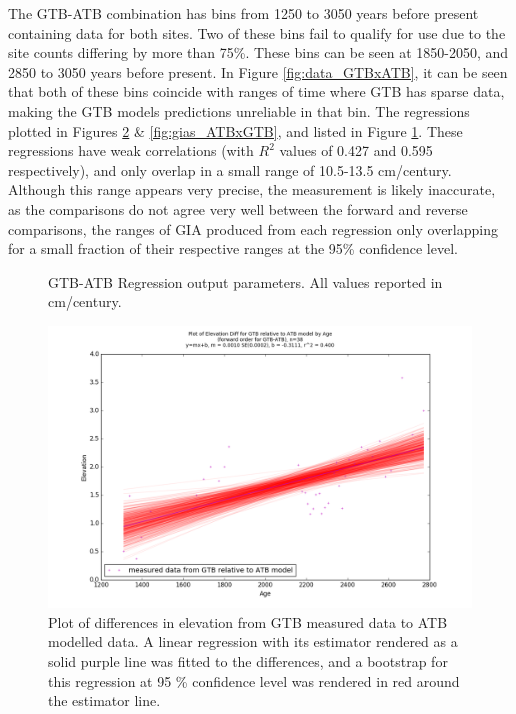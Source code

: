 The GTB-ATB combination has
bins from 1250 to 3050 years before present containing data for both sites. Two of these bins
fail to qualify for use due to the site counts differing by more
than 75\%. These bins can be seen at 1850-2050, and 2850 to 3050 years before present. 
In Figure \ref{fig:data_GTBxATB}, it can be seen that both of these bins coincide with ranges of
time where GTB has sparse data, making the GTB models predictions unreliable in that bin.
The regressions plotted in Figures \ref{fig:gias_GTBxATB} \& \ref{fig:gias_ATBxGTB}, and
listed in Figure \ref{fig:GTBxATB_regression}. These regressions have weak correlations
(with $R^2$ values of 0.427 and 0.595 respectively), and only overlap in a small
range of 10.5-13.5 cm/century. Although this range appears very precise, the measurement
is likely inaccurate, as the comparisons do not agree very well between the forward
and reverse comparisons, the ranges of GIA produced from each regression only
overlapping for a small fraction of their respective ranges at the 95\% confidence
level.\\

\begin{figure}[H]
	\begin{flushleft}
	\end{flushleft}
	\caption{GTB-ATB Regression output parameters. All values reported in cm/century.}
	\label{fig:GTBxATB_regression}
\end{figure}

\newpage

\begin{figure}[H]
	\includegraphics[width=1.3\linewidth, angle=270 ]{data/bothNonZero/withinSeventyFivePercent/gias/theGIA_GTB_relative_to_ATB.png}
	\caption{Plot of differences in elevation from GTB measured data to ATB modelled data. A linear regression with its estimator rendered as
	 a solid purple line was fitted to the differences, and a bootstrap for this regression at 95 \% confidence level was rendered in red
	 around the estimator line.}
	\label{fig:gias_GTBxATB}
\end{figure}
\newpage



